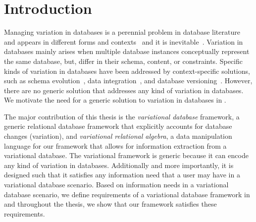 \chapter{Introduction}
\label{ch:intro}

%


Managing variation in databases is a perennial problem in database literature
and appears in different forms and 
contexts~\cite{curateVdata,ALW21vamos,ready17cidr,clams16sigmod,datahub15cidr}
and it is inevitable~\cite{dbDecay16Stonebraker}.
%
Variation in databases mainly arises when multiple database instances 
conceptually represent the same database, but, differ
in their schema, content, or constraints.
%
Specific kinds of variation in databases have been addressed by 
context-specific solutions, such as
schema evolution~\cite{SchEvolRA90McKenzie, 
schVersioning97Castro, tempSchEvol91Ariav, tsql95Snodgrass, 
prima08Moon}, 
data integration~\cite{dataIntegBook}, 
and database versioning~\cite{datasetVersioning,dbVersioning}.
%
However, there are no generic solution that addresses any kind of variation
in databases. We motivate the need for a generic solution to variation
in databases in .
%


The major contribution of this thesis is the \emph{variational database} framework,
a generic relational database framework that explicitly accounts for database changes (variation),
and \emph{variational relational algebra}, a data manipulation language for our framework
that allows for information extraction from a variational database. 
The variational framework is generic because it can encode any kind of variation
in databases. Additionally and more importantly, it is designed such that it satisfies
any information need that a user may have in a variational database scenario. 
Based on information needs in a variational database scenario, we define 
requirements of a variational database framework in  and throughout the
thesis, we show that our framework satisfies these requirements.

